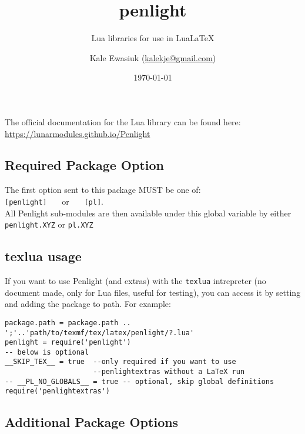 \documentclass[11pt,parskip=half]{scrartcl}
\author{Kale Ewasiuk (\url{kalekje@gmail.com})}
\date{\today}
\title{penlight}
\subtitle{Lua libraries for use in LuaLaTeX}
\newcommand{\cmd}[1]{\texttt{\detokenize{#1}}}
\begin{document}
\maketitle

        The official documentation for the Lua library can be found here:\\
  \mbox{\url{https://lunarmodules.github.io/Penlight}}
    \\

    \subsection*{Required Package Option}
    The first option sent to this package MUST be one of: \\
    \texttt{[penlight]} \ \ \  or \ \ \  \texttt{[pl]}.\\
    All Penlight sub-modules are then available under this global variable by either\\
    \texttt{penlight.XYZ} or \texttt{pl.XYZ}


  
  \subsection*{texlua usage}
If you want to use Penlight (and extras) with the \texttt{texlua} intrepreter (no document made, only for Lua files, useful for testing),
you can access it by setting \cmd{__SKIP_TEX__ = true} and adding the package to path. For example:
 \begin{verbatim}
package.path = package.path .. ';'..'path/to/texmf/tex/latex/penlight/?.lua'
penlight = require('penlight')
-- below is optional
__SKIP_TEX__ = true  --only required if you want to use
                     --penlightextras without a LaTeX run
-- __PL_NO_GLOBALS__ = true -- optional, skip global definitions
require('penlightextras')
\end{verbatim}

\pagebreak


\subsection*{Additional Package Options}
\end{document}
